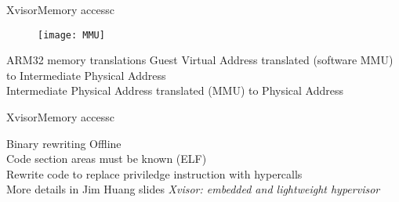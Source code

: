 \documentclass[english,slidetop,9pt,aspectratio=169]{beamer}
\begin{document}
  \begin{myframe}{Xvisor}{Memory access}{c}
    \begin{figure}
      \centering
      \texttt{[image: MMU]}
    \end{figure}
    \begin{nbox}{ARM32 memory translations}
      Guest Virtual Address translated (software MMU) to Intermediate Physical Address\\
      Intermediate Physical Address translated (MMU) to Physical Address
    \end{nbox}
  \end{myframe}

  \begin{myframe}[0]{Xvisor}{Memory access}{c}
    \begin{nbox}{Binary rewriting}
      Offline\\
      Code section areas must be known (ELF)\\
      Rewrite code to replace priviledge instruction with hypercalls\\
      More details in Jim Huang slides \textit{Xvisor: embedded and
        lightweight hypervisor}
    \end{nbox}
  \end{myframe}
\end{document}

